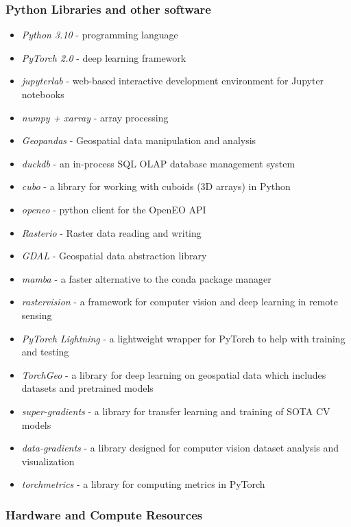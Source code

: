 \begin{multicols}{2}
\subsubsection{Python Libraries and other software}
\begin{itemize}
    \item \textit{Python 3.10} - programming language  
    \item \textit{PyTorch 2.0} - deep learning framework  
    \item \textit{jupyterlab} - web-based interactive development environment for Jupyter notebooks
    \item \textit{numpy + xarray} - array processing
    \item \textit{Geopandas} - Geospatial data manipulation and analysis
    \item \textit{duckdb} - an in-process SQL OLAP database management system
    \item \textit{cubo} - a library for working with cuboids (3D arrays) in Python
    \item \textit{openeo} - python client for the OpenEO API
    \item \textit{Rasterio} - Raster data reading and writing
    \item \textit{GDAL} - Geospatial data abstraction library
    \item \textit{mamba} - a faster alternative to the conda package manager
    \item \textit{rastervision} - a framework for computer vision and deep learning in remote sensing
    \item \textit{PyTorch Lightning} - a lightweight wrapper for PyTorch to help with training and testing
    \item \textit{TorchGeo} - a library for deep learning on geospatial data which includes datasets and pretrained models
    \item \textit{super-gradients} - a library for transfer learning and training of SOTA CV models
    \item \textit{data-gradients} - a library designed for computer vision dataset analysis and visualization
    \item \textit{torchmetrics} - a library for computing metrics in PyTorch
\end{itemize}

\subsubsection{Hardware and Compute Resources}


\end{multicols}
